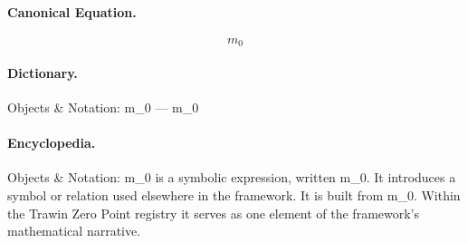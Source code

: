 \paragraph{Canonical Equation.}
\[
m_0
\]

\paragraph{Dictionary.}
Objects \& Notation: m\_0 — m\_0

\paragraph{Encyclopedia.}
Objects \& Notation: m\_0 is a symbolic expression, written m\_0. It introduces a symbol or relation used elsewhere in the framework. It is built from m\_0. Within the Trawin Zero Point registry it serves as one element of the framework's mathematical narrative.
